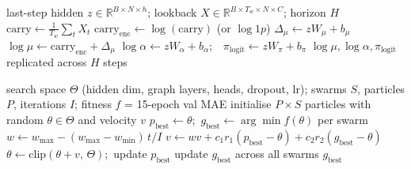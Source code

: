 \begin{algorithm}[t]
\caption{Persistence-residual count-aware decoding}
\label{alg:head}
\begin{algorithmic}[1]
\Require last-step hidden $z\in\mathbb{R}^{B\times N\times h}$; lookback $X\in\mathbb{R}^{B\times T_w\times N\times C}$; horizon $H$
\State $\mathrm{carry}\gets\frac{1}{T_w}\sum_{t} X_t$                  
\State $\mathrm{carry}_{\mathrm{enc}}\gets\log(\mathrm{carry})$ (or $\log1p$)  
\State $\Delta_\mu\gets z W_\mu + b_\mu$                              
\State $\log\mu\gets\mathrm{carry}_{\mathrm{enc}}+\Delta_\mu$         
\State $\log\alpha\gets z W_\alpha+b_\alpha$;\ \ $\pi_{\mathrm{logit}}\gets z W_\pi+b_\pi$
\State \Return $\log\mu,\log\alpha,\pi_{\mathrm{logit}}$ replicated across $H$ steps
\end{algorithmic}
\end{algorithm}

\begin{algorithm}[t]
\caption{Adaptive-inertia multi-swarm PSO for hyperparameter selection}
\label{alg:pso}
\begin{algorithmic}[1]
\Require search space $\Theta$ (hidden dim, graph layers, heads, dropout, lr);
swarms $S$, particles $P$, iterations $I$; fitness $f$ = 15-epoch val MAE
\State initialise $P\times S$ particles with random $\theta\in\Theta$ and velocity $v$
\State $p_{\mathrm{best}}\gets\theta$;\ $g_{\mathrm{best}}\gets\arg\min f(\theta)$ per swarm
  \State $w\gets w_{\max}-(w_{\max}-w_{\min})\,t/I$                 
    \State $v\gets w v+c_1 r_1(p_{\mathrm{best}}-\theta)+c_2 r_2(g_{\mathrm{best}}-\theta)$
    \State $\theta\gets\mathrm{clip}(\theta+v,\,\Theta)$;\ update $p_{\mathrm{best}}$
  \EndFor
  \State update $g_{\mathrm{best}}$ across all swarms                  
\EndFor
\State \Return $g_{\mathrm{best}}$                                 
\end{algorithmic}
\end{algorithm}